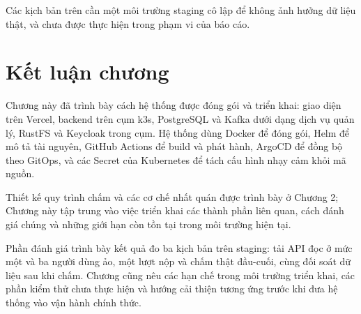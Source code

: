 \documentclass[../BTL.tex]{subfiles}
\begin{document}
Các kịch bản trên cần một môi trường staging cô lập để không ảnh hưởng dữ liệu thật, và chưa được thực hiện trong phạm vi của báo cáo.

\section{Kết luận chương}
\label{section:3.4}

Chương này đã trình bày cách hệ thống được đóng gói và triển khai: giao diện trên Vercel, backend trên cụm k3s, PostgreSQL và Kafka dưới dạng dịch vụ quản lý, RustFS và Keycloak trong cụm. Hệ thống dùng Docker để đóng gói, Helm để mô tả tài nguyên, GitHub Actions để build và phát hành, ArgoCD để đồng bộ theo GitOps, và các Secret của Kubernetes để tách cấu hình nhạy cảm khỏi mã nguồn.

Thiết kế quy trình chấm và các cơ chế nhất quán được trình bày ở Chương 2; Chương này tập trung vào việc triển khai các thành phần liên quan, cách đánh giá chúng và những giới hạn còn tồn tại trong môi trường hiện tại.

Phần đánh giá trình bày kết quả đo ba kịch bản trên staging: tải API đọc ở mức một và ba người dùng ảo, một lượt nộp và chấm thật đầu-cuối, cùng đối soát dữ liệu sau khi chấm. Chương cũng nêu các hạn chế trong môi trường triển khai, các phần kiểm thử chưa thực hiện và hướng cải thiện tương ứng trước khi đưa hệ thống vào vận hành chính thức.
\end{document}
